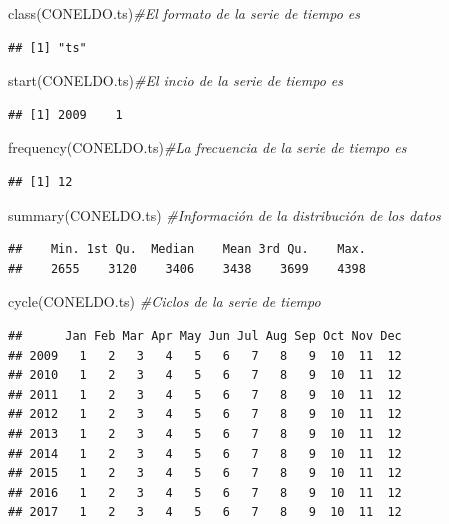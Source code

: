 \documentclass[
  spanish,
]{book}
\newenvironment{Shaded}{\begin{snugshade}}{\end{snugshade}}
\newcommand{\CommentTok}[1]{\textcolor[rgb]{0.56,0.35,0.01}{\textit{#1}}}
\newcommand{\FunctionTok}[1]{\textcolor[rgb]{0.00,0.00,0.00}{#1}}
\newcommand{\NormalTok}[1]{#1}
\theoremstyle{remark}
\begin{document}
\begin{Shaded}
\begin{Highlighting}[]
\FunctionTok{class}\NormalTok{(CONELDO.ts)}\CommentTok{\#El formato de la serie de tiempo es}
\end{Highlighting}
\end{Shaded}

\begin{verbatim}
## [1] "ts"
\end{verbatim}

\begin{Shaded}
\begin{Highlighting}[]
\FunctionTok{start}\NormalTok{(CONELDO.ts)}\CommentTok{\#El incio de la serie de tiempo es}
\end{Highlighting}
\end{Shaded}

\begin{verbatim}
## [1] 2009    1
\end{verbatim}

\begin{Shaded}
\begin{Highlighting}[]
\FunctionTok{frequency}\NormalTok{(CONELDO.ts)}\CommentTok{\#La frecuencia de la serie de tiempo es}
\end{Highlighting}
\end{Shaded}

\begin{verbatim}
## [1] 12
\end{verbatim}

\begin{Shaded}
\begin{Highlighting}[]
\FunctionTok{summary}\NormalTok{(CONELDO.ts) }\CommentTok{\#Información de la distribución de los datos}
\end{Highlighting}
\end{Shaded}

\begin{verbatim}
##    Min. 1st Qu.  Median    Mean 3rd Qu.    Max. 
##    2655    3120    3406    3438    3699    4398
\end{verbatim}

\begin{Shaded}
\begin{Highlighting}[]
\FunctionTok{cycle}\NormalTok{(CONELDO.ts)  }\CommentTok{\#Ciclos de la serie de tiempo}
\end{Highlighting}
\end{Shaded}

\begin{verbatim}
##      Jan Feb Mar Apr May Jun Jul Aug Sep Oct Nov Dec
## 2009   1   2   3   4   5   6   7   8   9  10  11  12
## 2010   1   2   3   4   5   6   7   8   9  10  11  12
## 2011   1   2   3   4   5   6   7   8   9  10  11  12
## 2012   1   2   3   4   5   6   7   8   9  10  11  12
## 2013   1   2   3   4   5   6   7   8   9  10  11  12
## 2014   1   2   3   4   5   6   7   8   9  10  11  12
## 2015   1   2   3   4   5   6   7   8   9  10  11  12
## 2016   1   2   3   4   5   6   7   8   9  10  11  12
## 2017   1   2   3   4   5   6   7   8   9  10  11  12
\end{verbatim}
\end{document}
